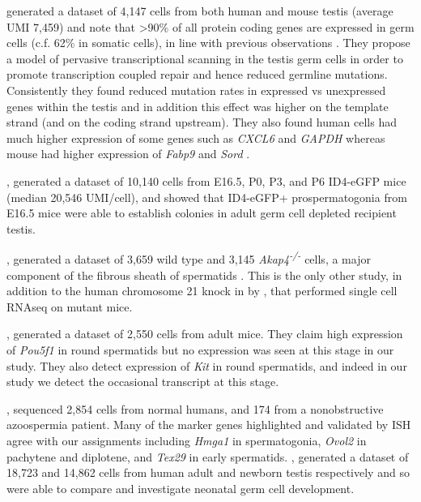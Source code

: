 \cite{Xia2019Widespread} generated a dataset of 4,147 cells from both human and mouse testis (average UMI 7,459) and note that >90\% of all protein coding genes are expressed in germ cells (c.f. 62\% in somatic cells), in line with previous observations \parencite{Soumillon2013Cellular, Schmidt1996Transcriptional}. They propose a model of pervasive transcriptional scanning in the testis germ cells in order to promote transcription coupled repair and hence reduced germline mutations. Consistently they found reduced mutation rates in expressed vs unexpressed genes within the testis and in addition this effect was higher on the template strand (and on the coding strand upstream). They also found human cells had much higher expression of some genes such as \textit{CXCL6} and \textit{GAPDH} whereas mouse had higher expression of \textit{Fabp9} and \textit{Sord} \parencite{Xia2019Widespread}.

\cite{Law2019Developmental}, generated a dataset of 10,140 cells from E16.5, P0, P3, and P6 ID4-eGFP mice (median 20,546 UMI/cell), and showed that ID4-eGFP+ prospermatogonia from E16.5 mice were able to establish colonies in adult germ cell depleted recipient testis.

\cite{Fang2019Proteomics}, generated a dataset of 3,659 wild type and 3,145 \textit{Akap4\textsuperscript{-/-}} cells, a major component of the fibrous sheath of spermatids \parencite{Eddy2003Fibrous}. This is the only other study, in addition to the human chromosome 21 knock in by \cite{Ernst2019Staged}, that performed single cell RNAseq on mutant mice.

\cite{Lukassen2018Characterization}, generated a dataset of 2,550 cells from adult mice. They claim high expression of \textit{Pou5f1} in round spermatids but no expression was seen at this stage in our study. They also detect expression of \textit{Kit} in round spermatids, and indeed in our study we detect the occasional transcript at this stage. 


\cite{Wang2018SingleCell}, sequenced 2,854 cells from normal humans, and 174 from a nonobstructive azoospermia patient. Many of the marker genes highlighted and validated by ISH agree with our assignments including \textit{Hmga1} in spermatogonia, \textit{Ovol2} in pachytene and diplotene, and \textit{Tex29} in early spermatids. \cite{Sohni2019Neonatal}, generated a dataset of 18,723 and 14,862 cells from human adult and newborn testis respectively and so were able to compare and investigate neonatal germ cell development.

